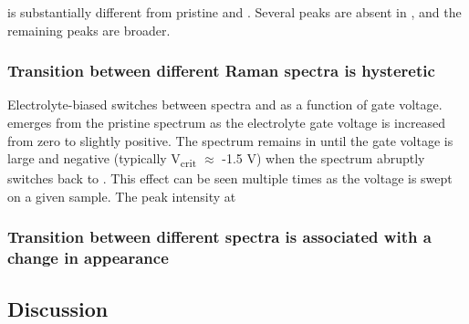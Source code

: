 \pone{} is substantially different from pristine \rucl and \pzero . Several peaks are absent in \pone , and the remaining peaks are broader.

\subsubsection{Transition between different Raman spectra is hysteretic}

Electrolyte-biased \rucl switches between spectra \pzero{} and \pone{} as a function of gate voltage. \pone{} emerges from the pristine \rucl spectrum as the electrolyte gate voltage is increased from zero to slightly positive. The spectrum remains in \pone{} until the gate voltage is large and negative (typically V\textsubscript{crit} $\approx$ -1.5 V) when the spectrum abruptly switches back to \pzero . This effect can be seen multiple times as the voltage is swept on a given sample. The peak intensity at 

\subsubsection{Transition between different spectra is associated with a change in appearance}

\subsection{Discussion}